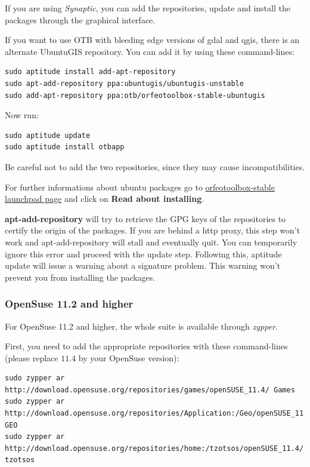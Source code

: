 If you are using \emph{Synaptic}, you can add the repositories, update
and install the packages through the graphical interface.

If you want to use OTB with bleeding edge versions of gdal and qgis,
there is an alternate UbuntuGIS repository.  You can add it by using
these command-lines:
\begin{verbatim}
sudo aptitude install add-apt-repository 
sudo apt-add-repository ppa:ubuntugis/ubuntugis-unstable
sudo add-apt-repository ppa:otb/orfeotoolbox-stable-ubuntugis
\end{verbatim}
Now run:
\begin{verbatim}
sudo aptitude update
sudo aptitude install otbapp
\end{verbatim}

Be careful not to add the two repositories, since they may cause
incompatibilities.

For further informations about ubuntu packages go to
\href{https://launchpad.net/~otb/+archive/orfeotoolbox-stable}{orfeotoolbox-stable
  launchpad page} and click on \textbf{Read about installing}.

\textbf{apt-add-repository} will try to retrieve the GPG keys of the
repositories to certify the origin of the packages. If you are behind
a http proxy, this step won't work and apt-add-repository will stall
and eventually quit. You can temporarily ignore this error and proceed
with the update step. Following this, aptitude update will issue a
warning about a signature problem. This warning won't prevent you from
installing the packages.

\subsubsection{OpenSuse 11.2 and higher}
\label{ssec:opensuse_binaries}

For OpenSuse 11.2 and higher, the whole \otb suite is available
through \emph{zypper}.

First, you need to add the appropriate repositories with these
command-lines (please replace $11.4$ by your OpenSuse version):
\begin{verbatim}
sudo zypper ar 
http://download.opensuse.org/repositories/games/openSUSE_11.4/ Games
sudo zypper ar 
http://download.opensuse.org/repositories/Application:/Geo/openSUSE_11.4/ GEO
sudo zypper ar 
http://download.opensuse.org/repositories/home:/tzotsos/openSUSE_11.4/ tzotsos
\end{verbatim}

